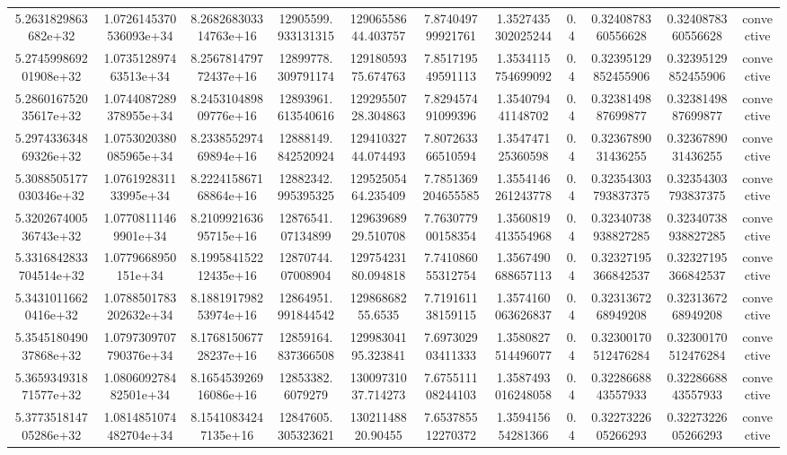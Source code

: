 \begin{table}
\begin{tabular}{ccccccccccc}
5.2631829863682e+32 & 1.0726145370536093e+34 & 8.268268303314763e+16 & 12905599.933131315 & 12906558644.403757 & 7.874049799921761 & 1.3527435302025244 & 0.4 & 0.3240878360556628 & 0.3240878360556628 & convective \\
5.274599869201908e+32 & 1.073512897463513e+34 & 8.256781479772437e+16 & 12899778.309791174 & 12918059375.674763 & 7.851719549591113 & 1.3534115754699092 & 0.4 & 0.32395129852455906 & 0.32395129852455906 & convective \\
5.286016752035617e+32 & 1.0744087289378955e+34 & 8.245310489809776e+16 & 12893961.613540616 & 12929550728.304863 & 7.829457491099396 & 1.354079441148702 & 0.4 & 0.3238149887699877 & 0.3238149887699877 & convective \\
5.297433634869326e+32 & 1.0753020380085965e+34 & 8.233855297469894e+16 & 12888149.842520924 & 12941032744.074493 & 7.807263366510594 & 1.354747125360598 & 0.4 & 0.3236789031436255 & 0.3236789031436255 & convective \\
5.3088505177030346e+32 & 1.076192831133995e+34 & 8.222415867168864e+16 & 12882342.995395325 & 12952505464.235409 & 7.7851369204655585 & 1.3554146261243778 & 0.4 & 0.32354303793837375 & 0.32354303793837375 & convective \\
5.320267400536743e+32 & 1.07708111469901e+34 & 8.210992163695715e+16 & 12876541.07134899 & 12963968929.510708 & 7.763077900158354 & 1.3560819413554968 & 0.4 & 0.32340738938827285 & 0.32340738938827285 & convective \\
5.3316842833704514e+32 & 1.0779668950151e+34 & 8.199584152212435e+16 & 12870744.07008904 & 12975423180.094818 & 7.741086055312754 & 1.3567490688657113 & 0.4 & 0.32327195366842537 & 0.32327195366842537 & convective \\
5.34310116620416e+32 & 1.0788501783202632e+34 & 8.188191798253974e+16 & 12864951.991844542 & 12986868255.6535 & 7.719161138159115 & 1.3574160063626837 & 0.4 & 0.3231367268949208 & 0.3231367268949208 & convective \\
5.354518049037868e+32 & 1.0797309707790376e+34 & 8.176815067728237e+16 & 12859164.837366508 & 12998304195.323841 & 7.697302903411333 & 1.3580827514496077 & 0.4 & 0.32300170512476284 & 0.32300170512476284 & convective \\
5.365934931871577e+32 & 1.080609278482501e+34 & 8.165453926916086e+16 & 12853382.6079279 & 13009731037.714273 & 7.675511108244103 & 1.3587493016248058 & 0.4 & 0.3228668843557933 & 0.3228668843557933 & convective \\
5.377351814705286e+32 & 1.0814851074482704e+34 & 8.15410834247135e+16 & 12847605.305323621 & 13021148820.90455 & 7.653785512270372 & 1.359415654281366 & 0.4 & 0.3227322605266293 & 0.3227322605266293 & convective \\

\end{tabular}
\end{table}
